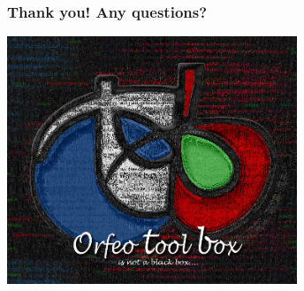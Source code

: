 \documentclass[8pt]{beamer}
\begin{document}
\begin{frame}
\frametitle{Thank you! Any questions?}
\begin{minipage}[t][6cm][t]{\textwidth}
\begin{center}
\includegraphics[width=0.65\textwidth]{images/LOGOTB_blackbox.png}
\end{center}
\end{minipage}
\end{frame}
\end{document}
